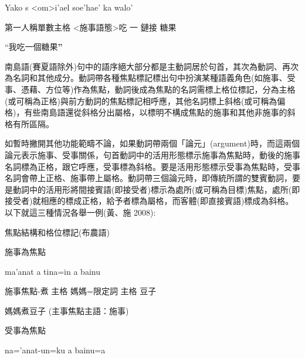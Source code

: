 \begin{listWWviiiNumviiileveli}
\item \begin{styleqwerty}\rmfamily
Yako  s <om>i’ael  soe’hae’  ka  walo’
\end{styleqwerty}
\end{listWWviiiNumviiileveli}
\rmfamily
  第一人稱單數主格  <施事語態>吃  一  鏈接  糖果

 \textrm{``我吃一個糖果}\textrm{\textbf{''}}

\textrm{南島語(賽夏語除外)句中的語序絕大部分都是主動詞居於句首，其次為動詞、再次為名詞和其他成分。動詞帶各種焦點標記標出句中扮演某種語義角色(如施事、受事、憑藉、方位等)作為焦點，動詞後成為焦點的名詞需標上格位標記，分為主格(或可稱為正格)與前方動詞的焦點標記相呼應，其他名詞標上斜格(或可稱為偏格)}，\textrm{有些南島語還從斜格分出屬格，以標明不構成焦點的施事和其他非施事的斜格有所區隔。}

\textrm{如暫時撇開其他功能範疇不論，如果動詞帶兩個「論元」(argument)時，而這兩個論元表示施事、受事關係，句首動詞中的活用形態標示施事為焦點時，動後的施事名詞標為正格，跟它呼應，受事標為斜格。要是活用形態標示受事為焦點時，受事名詞會帶上正格、施事帶上屬格。動詞帶三個論元時，即傳統所謂的雙賓動詞，要是動詞中的活用形將間接賓語(即接受者)標示為處所(或可稱為目標)焦點，處所(即接受者)就相應的標成正格，給予者標為屬格，而客體(即直接賓語)標成為斜格。以下就這三種情況各舉一例(黃、施 2008):}

\rmfamily
焦點結構和格位標記(布農語)

\rmfamily
施事為焦點

\begin{listWWviiiNumviiileveli}
\item \begin{styleqwerty}\rmfamily
ma’anat  a  tina=in  a  bainu
\end{styleqwerty}
\end{listWWviiiNumviiileveli}

 \textrm{施事焦點-煮  主格  媽媽=限定詞  主格  豆子}

 \textrm{媽媽煮豆子 (主事焦點主語：施事)}

\rmfamily
受事為焦點

\begin{listWWviiiNumviiileveli}
\item \begin{styleqwerty}\rmfamily
na=’anat-un=ku  a  bainu=a
\end{styleqwerty}
\end{listWWviiiNumviiileveli}

